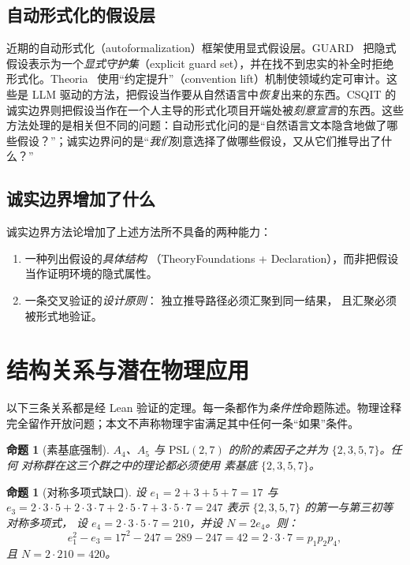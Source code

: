\documentclass[11pt]{ctexart}
\newtheorem{proposition}[theorem]{命题}
\begin{document}
\subsection{自动形式化的假设层}
近期的自动形式化（autoformalization）框架使用显式假设层。GUARD~\cite{quan2026} 把隐式假设表示为一个\emph{显式守护集}（explicit guard set），并在找不到忠实的补全时拒绝形式化。Theoria~\cite{saldivar2026} 使用“约定提升”（convention lift）机制使领域约定可审计。这些是 LLM 驱动的方法，把假设当作要从自然语言中\emph{恢复}出来的东西。CSQIT 的诚实边界则把假设当作在一个人主导的形式化项目开端处被\emph{刻意宣言}的东西。这些方法处理的是相关但不同的问题：自动形式化问的是“自然语言文本隐含地做了哪些假设？”；诚实边界问的是“\emph{我们}刻意选择了做哪些假设，又从它们推导出了什么？”

\subsection{诚实边界增加了什么}
诚实边界方法论增加了上述方法所不具备的两种能力：
\begin{enumerate}
\item 一种列出假设的\emph{具体结构}
  （TheoryFoundations + Declaration），而非把假设
  当作证明环境的隐式属性。
\item 一条交叉验证的\emph{设计原则}：
  独立推导路径必须汇聚到同一结果，
  且汇聚必须被形式地验证。
\end{enumerate}

\section{结构关系与潜在物理应用}
\label{sec:relations}

以下三条关系都是经 Lean 验证的定理。每一条都作为\emph{条件性}命题陈述。物理诠释完全留作开放问题；本文不声称物理宇宙满足其中任何一条“如果”条件。

\begin{proposition}[素基底强制]
\label{prop:forcing}
$A_4$、$A_5$ 与
$\mathrm{PSL}(2,7)$ 的阶的素因子之并为 $\{2,3,5,7\}$。任何
对称群在这三个群之中的理论都必须使用
素基底 $\{2,3,5,7\}$。
\end{proposition}

\begin{proposition}[对称多项式缺口]
\label{prop:gap}
设 $e_1 = 2+3+5+7 = 17$ 与 $e_3 = 2 \cdot 3 \cdot 5
+ 2 \cdot 3 \cdot 7 + 2 \cdot 5 \cdot 7 + 3 \cdot 5 \cdot 7
= 247$ 表示 $\{2,3,5,7\}$ 的第一与第三初等对称多项式，
设 $e_4 = 2 \cdot 3 \cdot
5 \cdot 7 = 210$，并设 $N = 2 e_4$。则：
\[
e_1^2 - e_3 = 17^2 - 247 = 289 - 247 = 42
= 2 \cdot 3 \cdot 7 = p_1 p_2 p_4,
\]
且 $N = 2 \cdot 210 = 420$。
\end{proposition}
\end{document}

